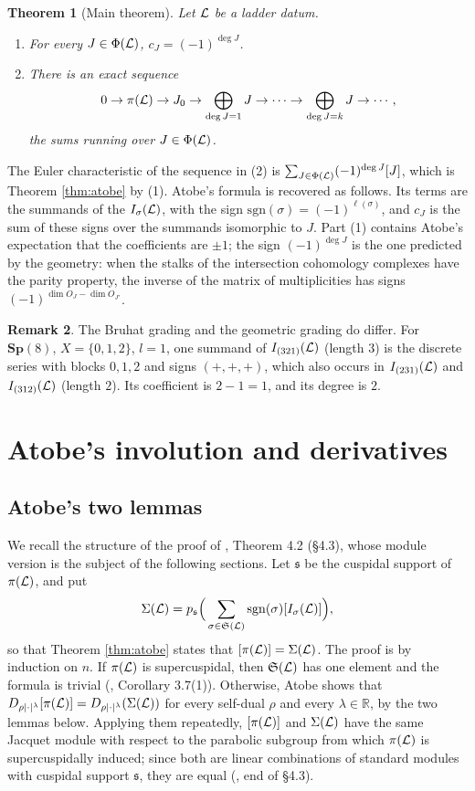 \documentclass[a4paper,12pt,leqno]{amsart}
\theoremstyle{plain}
\newtheorem{thm}{Theorem}[section]
\theoremstyle{definition}
\newtheorem{rmk}[thm]{Remark}
\providecommand{\frS}{\mathfrak{S}}\providecommand{\frs}{\mathfrak{s}}
\begin{document}
\begin{thm}[Main theorem]\label{conj:geom} Let $\mathcal{L}$ be a ladder datum.
\begin{enumerate}
\item For every $J\in\Phi(\mathcal{L})$, $c_J=(-1)^{\deg J}$.
\item There is an exact sequence
\[0\to\pi(\mathcal{L})\to J_0\to\bigoplus_{\deg J=1}J\to\cdots\to\bigoplus_{\deg J=k}J\to\cdots,\]
the sums running over $J\in\Phi(\mathcal{L})$.
\end{enumerate}
\end{thm}

\noindent The Euler characteristic of the sequence in (2) is $\sum_{J\in\Phi(\mathcal{L})}(-1)^{\deg J}[J]$,
which is Theorem \ref{thm:atobe} by (1). Atobe's formula is recovered as follows. Its terms are the
summands of the $I_\sigma(\mathcal{L})$, with the sign $\mathrm{sgn}(\sigma)=(-1)^{\ell(\sigma)}$, and $c_J$ is the
sum of these signs over the summands isomorphic to $J$.
 Part (1) contains Atobe's expectation that the coefficients are $\pm1$; the sign
$(-1)^{\deg J}$ is the one predicted by the geometry: when the stalks of the intersection cohomology
complexes have the parity property, the inverse of the matrix of multiplicities has signs
$(-1)^{\dim O_J-\dim O_{J'}}$.

\begin{rmk}\label{rem:twins} The Bruhat grading and the geometric grading do differ. For
$\mathbf{Sp}(8)$, $X=\{0,1,2\}$, $l=1$, one summand of $I_{(321)}(\mathcal{L})$ (length $3$) is the discrete series
with blocks $0,1,2$ and signs $(+,+,+)$, which also occurs in $I_{(231)}(\mathcal{L})$ and $I_{(312)}(\mathcal{L})$
(length $2$). Its coefficient is $2-1=1$, and its degree is $2$.
\end{rmk}

\section{Atobe's involution and derivatives}\label{sec:step1}

\subsection{Atobe's two lemmas}
We recall the structure of the proof of \cite{Ato24}, Theorem 4.2 (\S 4.3), whose module version is
the subject of the following sections. Let $\frs$ be the cuspidal support of $\pi(\mathcal{L})$, and put
\[\Sigma(\caL)=p_\frs\Big(\sum_{\sigma\in\frS(\caL)}\mathrm{sgn}(\sigma)[I_\sigma(\caL)]\Big),\]
so that Theorem \ref{thm:atobe} states that $[\pi(\mathcal{L})]=\Sigma(\mathcal{L})$. The proof is by induction on
$n$. If $\pi(\mathcal{L})$ is supercuspidal, then $\frS(\caL)$ has one element and the formula is trivial
(\cite{Ato24}, Corollary 3.7(1)). Otherwise, Atobe shows that $D_{\rho|\cdot|^\lambda}[\pi(\mathcal{L})]=
D_{\rho|\cdot|^\lambda}(\Sigma(\mathcal{L}))$ for every self-dual $\rho$ and every $\lambda\in\mathbb{R}$, by the two
lemmas below. Applying them repeatedly, $[\pi(\mathcal{L})]$ and $\Sigma(\mathcal{L})$ have the same Jacquet module
with respect to the parabolic subgroup from which $\pi(\mathcal{L})$ is supercuspidally induced; since both
are linear combinations of standard modules with cuspidal support $\frs$, they are equal (\cite{Ato24},
end of \S4.3).
\end{document}
